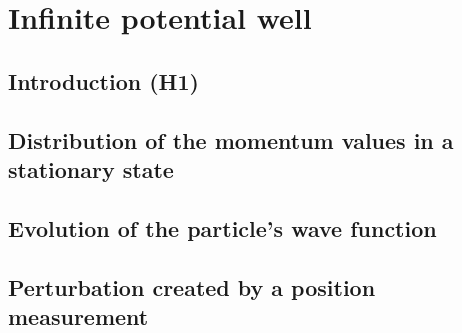 \section{Infinite potential well}

\subsection{Introduction (H1)}



\subsection{Distribution of the momentum values in a stationary state}

\subsection{Evolution of the particle's wave function}

\subsection{Perturbation created by a position measurement}